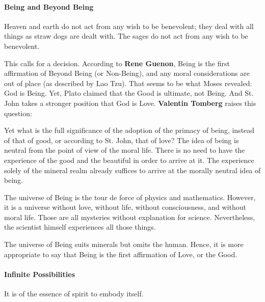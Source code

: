 \paragraph{Being and Beyond Being}


\begin{quotex}
Heaven and earth do not act from any wish to be benevolent; they deal with all things as straw dogs are dealt with. The sages do not act from any wish to be benevolent.
\end{quotex}


This calls for a decision. According to \textbf{Rene Guenon}, Being is the first affirmation of Beyond Being (or Non-Being), and any moral considerations are out of place (as described by Lao Tzu). That seems to be what Moses revealed: God is Being. Yet, Plato claimed that the Good is ultimate, not Being. And St. John takes a stronger position that God is Love. \textbf{Valentin Tomberg} raises this question:

\begin{quotex}
Yet what is the full significance of the adoption of the primacy of being, instead of that of good, or according to St. John, that of love? The idea of being is neutral from the point of view of the moral life. There is no need to have the experience of the good and the beautiful in order to arrive at it. The experience solely of the mineral realm already suffices to arrive at the morally neutral idea of being.
\end{quotex}


The universe of Being is the tour de force of physics and mathematics. However, it is a universe without love, without life, without consciousness, and without moral life. Those are all mysteries without explanation for science. Nevertheless, the scientist himself experiences all those things.

The universe of Being suits minerals but omits the human. Hence, it is more appropriate to say that Being is the first affirmation of Love, or the Good.

\paragraph{Infinite Possibilities}


\begin{quotex}
It is of the essence of spirit to embody itself.
\end{quotex}


